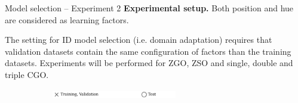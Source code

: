 \begin{frame}{Model selection -- Experiment 2}
	\textbf{Experimental setup.} Both position and hue are considered as learning factors.


    The setting for ID model selection (i.e. domain adaptation) requires that validation datasets contain the
    same configuration of factors than the training datasets. Experiments will be performed for
    ZGO, ZSO and single, double and triple CGO.

    \begin{figure}[H]
        \centering
        \begin{subfigure}[b]{\textwidth}
            \centering
            \includegraphics[width=0.6\textwidth]{img/msel/_legend_theory.pdf}
        \end{subfigure}
        \vspace{-0.2cm} %


\end{figure}
\end{frame}
